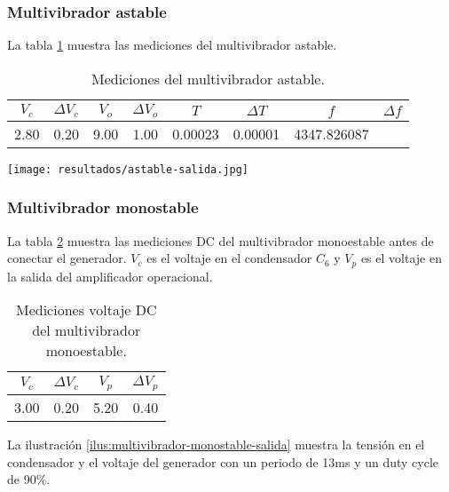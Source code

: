 \FloatBarrier
\subsubsection{Multivibrador astable}

La tabla \ref{tab:resultados-multivibrador-astable} muestra las mediciones del multivibrador astable.

\begin{table}[ht]
\centering
\begin{tabular}{|c|c|c|c|c|c|c|c|}
\hline
\(V_c\) & \(\Delta V_c\) & \(V_o\) & \(\Delta V_o\) & \(T\) & \(\Delta T\) & \(f\) & \(\Delta f\) \\ \hline
2.80 & 0.20 & 9.00 & 1.00 & 0.00023 & 0.00001 & 4347.826087 & \\ \hline
\end{tabular}
\caption{Mediciones del multivibrador astable.}
\label{tab:resultados-multivibrador-astable}
\end{table}

\begin{ilustracion}[ht]
    \centering
    \texttt{[image: resultados/astable-salida.jpg]}
    \caption{Medición de voltajes del multivibrador astable (canal 1 $V_o$, canal 2 $V_c$).}
    \label{fig:multivibrador-astable-salida}
\end{ilustracion}

\subsubsection{Multivibrador monostable}

La tabla \ref{tab:resultados-multivibrador-monostable} muestra las mediciones DC del multivibrador monoestable antes de conectar el generador. $V_c$ es el voltaje en el condensador $C_6$ y $V_p$ es el voltaje en la salida del amplificador operacional.

\begin{table}[ht]
\centering
\begin{tabular}{|c|c|c|c|}
\hline
\(V_c\) & \(\Delta V_c\) & \(V_p\) & \(\Delta V_p\) \\ \hline
3.00 & 0.20 & 5.20 & 0.40 \\ \hline
\end{tabular}
\caption{Mediciones voltaje DC del multivibrador monoestable.}
\label{tab:resultados-multivibrador-monostable}
\end{table}

La ilustración \ref{ilus:multivibrador-monostable-salida} muestra la tensión en el condensador y el voltaje del generador con un periodo de 13ms y un duty cycle de 90\%.

